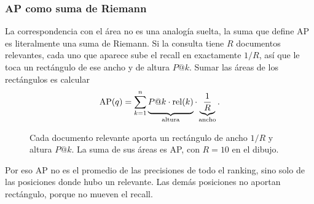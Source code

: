 \documentclass[11pt,letterpaper]{article}
\begin{document}
\subsubsection*{AP como suma de Riemann}

La correspondencia con el área no es una analogía suelta, la suma que
define AP es literalmente una suma de Riemann. Si la consulta tiene
$R$ documentos relevantes, cada uno que aparece sube el recall en
exactamente $1/R$, así que le toca un rectángulo de ese ancho y de
altura $P@k$. Sumar las áreas de los rectángulos es calcular
\[
    \mathrm{AP}(q) = \sum_{k=1}^{n}
    \underbrace{\vphantom{\frac{1}{R}} P@k \cdot \mathrm{rel}(k)}
               _{\text{altura}} \cdot
    \underbrace{\frac{1}{R}}_{\text{ancho}} .
\]

\begin{figure}[htbp]
  \centering
  \caption{Cada documento relevante aporta un rectángulo de ancho
    $1/R$ y altura $P@k$. La suma de sus áreas es AP, con $R = 10$
    en el dibujo.}
  \label{fig:riemann-ap}
\end{figure}

\begin{ojo}
    Por eso AP no es el promedio de las precisiones de todo el
    ranking, sino solo de las posiciones donde hubo un relevante. Las
    demás posiciones no aportan rectángulo, porque no mueven el
    recall.
\end{ojo}
\end{document}
